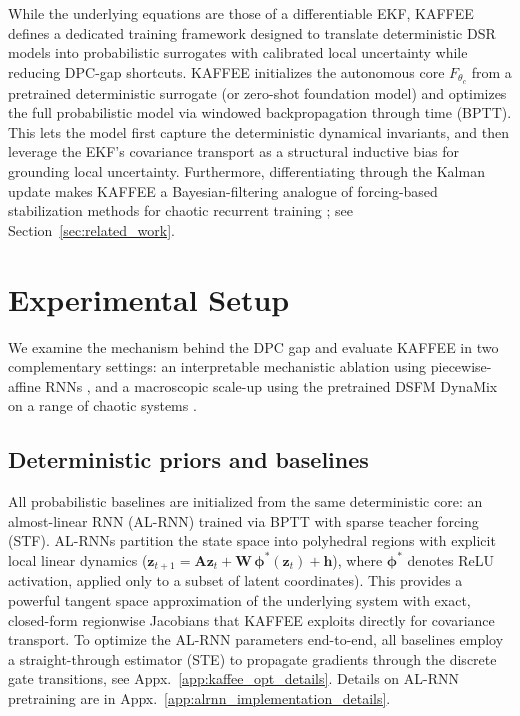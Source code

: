 \documentclass{article}
\theoremstyle{plain}
\theoremstyle{definition}
\theoremstyle{remark}
\begin{document}
While the underlying equations are those of a differentiable EKF, KAFFEE defines a dedicated training framework designed to translate deterministic DSR models into probabilistic surrogates with calibrated local uncertainty while reducing DPC-gap shortcuts. KAFFEE initializes the autonomous core $F_{\theta_c}$ from a pretrained deterministic surrogate (or zero-shot foundation model) and optimizes the full probabilistic model via windowed backpropagation through time (BPTT). This lets the model first capture the deterministic dynamical invariants, and then leverage the EKF's covariance transport as a structural inductive bias for grounding local uncertainty. Furthermore, differentiating through the Kalman update makes KAFFEE a Bayesian-filtering analogue of forcing-based stabilization methods for chaotic recurrent training \citep{hess2023generalized,mikhaeil2022difficulty,sagtekin2025error,herz2026teacher}; see Section~\ref{sec:related_work}.

\section{Experimental Setup}
\label{sec:exp_setup}

We examine the mechanism behind the DPC gap and evaluate KAFFEE in two complementary settings: an interpretable mechanistic ablation using piecewise-affine RNNs \citep{koppe2019identifying,brenner2024almostlinear}, and a macroscopic scale-up using the pretrained DSFM DynaMix on a range of chaotic systems \citep{hemmer2025true}.


\subsection{Deterministic priors and baselines}
\label{subsec:benchmarks}
 
All probabilistic baselines are initialized from the same deterministic core: an almost-linear RNN (AL-RNN) \citep{brenner2024almostlinear} trained via BPTT with sparse teacher forcing (STF). AL-RNNs partition the state space into polyhedral regions with explicit local linear dynamics ($\bm z_{t+1} = \bm A\bm z_t + \bm W\,\bm\phi^\ast(\bm z_t) + \bm h$), where $\bm\phi^\ast$ denotes ReLU activation, applied only to a subset of latent coordinates). This provides a powerful tangent space approximation of the underlying system with exact, closed-form regionwise Jacobians that KAFFEE exploits directly for covariance transport. To optimize the AL-RNN parameters end-to-end, all baselines employ a straight-through estimator (STE) to propagate gradients through the discrete gate transitions, see Appx.~\ref{app:kaffee_opt_details}. Details on AL-RNN pretraining are in Appx.~\ref{app:alrnn_implementation_details}.
\end{document}
